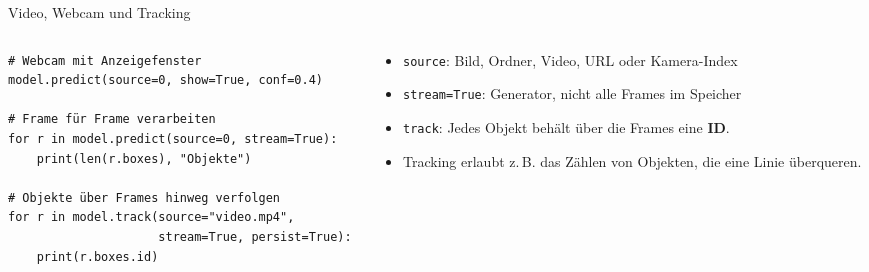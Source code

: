 \begin{frame}[fragile]{Video, Webcam und Tracking}
\footnotesize
\begin{columns}
\begin{column}{0.60\textwidth}
{\footnotesize
\begin{verbatim}
# Webcam mit Anzeigefenster
model.predict(source=0, show=True, conf=0.4)

# Frame für Frame verarbeiten
for r in model.predict(source=0, stream=True):
    print(len(r.boxes), "Objekte")

# Objekte über Frames hinweg verfolgen
for r in model.track(source="video.mp4",
                     stream=True, persist=True):
    print(r.boxes.id)
\end{verbatim}
}
\end{column}
\begin{column}{0.35\textwidth}
\begin{itemize}
  \item \texttt{source}: Bild, Ordner, Video, URL oder Kamera-Index
  \item \texttt{stream=True}: Generator, nicht alle Frames im Speicher
  \item \texttt{track}: Jedes Objekt behält über die Frames eine \textbf{ID}.
  \item Tracking erlaubt z.\,B. das Zählen von Objekten, die eine Linie überqueren.
\end{itemize}
\end{column}
\end{columns}
\end{frame}

